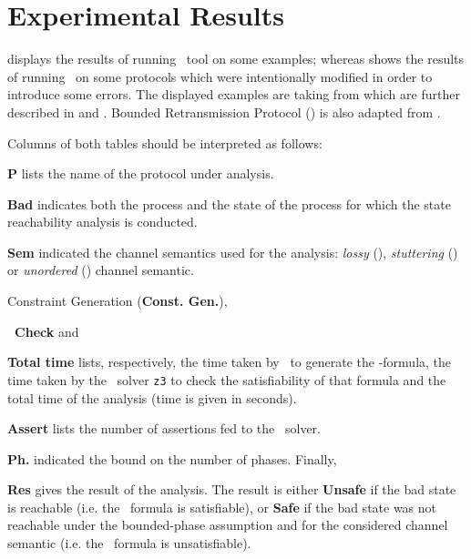\section{Experimental Results}

 displays the results of running \MPass\ tool on  some examples;
whereas  shows the results of running \MPass\ on some protocols which were intentionally modified in order to introduce some errors.
%
The displayed  examples are   taking  from \cite{JRSVgit}  which are further described in \cite{MPSV11} and \cite{RSV11}.
%
Bounded Retransmission Protocol (\Brp) is also adapted from \cite{AABJ04}.


Columns of both tables should be interpreted as follows:
%
\begin{inparaenum}
\item {\bf P} lists the name of the protocol under analysis.
\item {\bf Bad} indicates both the process and the state of the process for which the state reachability analysis is conducted.
\item {\bf Sem} indicated the channel semantics used for the analysis: \textit{lossy} (\Lcs), \textit{stuttering} (\Slcs) or \textit{unordered} (\Ucs) channel semantic.
\item Constraint Generation (\textbf{Const. Gen.}),
\item \textbf{\Smt\ Check} and
\item {\bf Total time} lists, respectively, the time taken by \MPass\ to generate  the \Smt-formula,
the time taken by the \Smt\ solver \texttt{z3} to check the satisfiability of that formula and the total time of the analysis
(time is given in seconds).
\item {\bf Assert} lists the number of assertions fed to the \Smt\ solver.
\item {\bf Ph.} indicated the bound on the number of phases. Finally,
\item {\bf Res} gives the result of the analysis. The result is either \textbf{Unsafe} if the bad state is reachable (i.e. the \Smt\ formula is satisfiable), or
\textbf{Safe}  if the bad state was not reachable under the bounded-phase assumption and for the considered channel semantic
(i.e. the \Smt\ formula is unsatisfiable).
\end{inparaenum}

